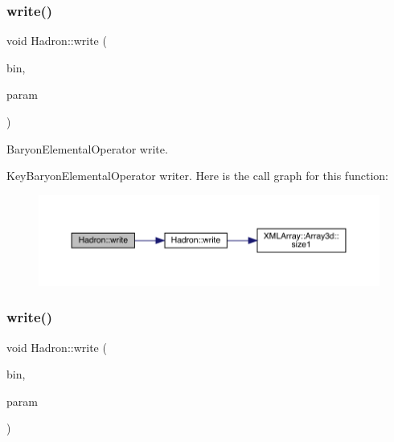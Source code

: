 \subsubsection{\texorpdfstring{write()}{write()}\hspace{0.1cm}{\footnotesize\ttfamily [43/95]}}
{\footnotesize\ttfamily void Hadron\+::write (\begin{DoxyParamCaption}\item[{\mbox{\hyperlink{classADATIO_1_1BinaryWriter}{Binary\+Writer}} \&}]{bin,  }\item[{const \mbox{\hyperlink{structHadron_1_1KeyBaryonElementalOperator__t}{Key\+Baryon\+Elemental\+Operator\+\_\+t}} \&}]{param }\end{DoxyParamCaption})}



Baryon\+Elemental\+Operator write. 

Key\+Baryon\+Elemental\+Operator writer. Here is the call graph for this function\+:
\nopagebreak
\begin{figure}[H]
\begin{center}
\leavevmode
\includegraphics[width=350pt]{d1/daf/namespaceHadron_a4c0a824fa457c4fbaac034c83f5554c5_cgraph}
\end{center}
\end{figure}
\mbox{\label{namespaceHadron_a4330be9331eb4c839e7e123f5306560b}} 
\subsubsection{\texorpdfstring{write()}{write()}\hspace{0.1cm}{\footnotesize\ttfamily [44/95]}}
{\footnotesize\ttfamily void Hadron\+::write (\begin{DoxyParamCaption}\item[{\mbox{\hyperlink{classADATIO_1_1BinaryWriter}{Binary\+Writer}} \&}]{bin,  }\item[{const \mbox{\hyperlink{structHadron_1_1KeyParticleOp__t}{Key\+Particle\+Op\+\_\+t}} \&}]{param }\end{DoxyParamCaption})}



